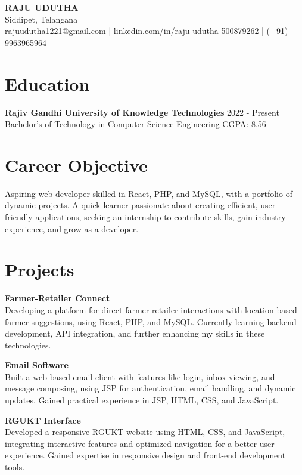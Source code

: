 \documentclass[a4paper,10pt]{article}
\begin{document}
	\pagestyle{empty}
	
	\begin{center}
		{\LARGE \textbf{RAJU UDUTHA}} \\
		Siddipet, Telangana \\
		\href{mailto:rajuudutha1221@gmail.com}{rajuudutha1221@gmail.com} | 
		\href{https://linkedin.com/in/raju-udutha-500879262}{linkedin.com/in/raju-udutha-500879262} | (+91) 9963965964
	\end{center}
	
	\section*{Education}
	\textbf{Rajiv Gandhi University of Knowledge Technologies} \hfill 2022 - Present \\
	Bachelor’s of Technology in Computer Science Engineering \hfill CGPA: 8.56
	
	\section*{Career Objective}
	Aspiring web developer skilled in React, PHP, and MySQL, with a portfolio of dynamic projects. A quick learner passionate about creating efficient, user-friendly applications, seeking an internship to contribute skills, gain industry experience, and grow as a developer.
	
	\section*{Projects}
	\textbf{Farmer-Retailer Connect} \\
	Developing a platform for direct farmer-retailer interactions with location-based farmer suggestions, using React, PHP, and MySQL. Currently learning backend development, API integration, and further enhancing my skills in these technologies.
	
	\textbf{Email Software} \\
	Built a web-based email client with features like login, inbox viewing, and message composing, using JSP for authentication, email handling, and dynamic updates. Gained practical experience in JSP, HTML, CSS, and JavaScript.
	
	\textbf{RGUKT Interface} \\
	Developed a responsive RGUKT website using HTML, CSS, and JavaScript, integrating interactive features and optimized navigation for a better user experience. Gained expertise in responsive design and front-end development tools.
	
\end{document}
